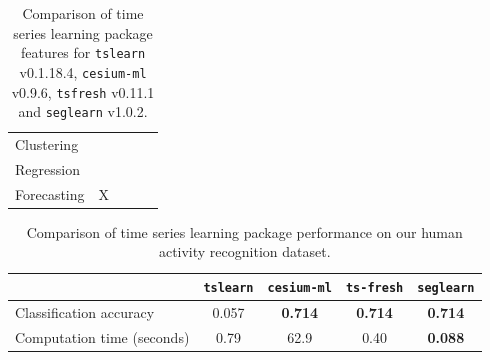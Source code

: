 \documentclass[twoside,11pt]{article}
\newcommand{\greencheck}{{\color{green}\checkmark}}
\newcommand{\redx}{{\color{red}X}}
\begin{document}
\begin{table}[]
\begin{tabular}{lcccc}
		Clustering                         & \greencheck              & \greencheck                & \greencheck               & \greencheck               \\
		Regression                         & \greencheck              & \greencheck                & \greencheck               & \greencheck               \\
		Forecasting                        & \redx               & \greencheck                & \greencheck               & \greencheck              \\ \bottomrule
	\end{tabular}
	\caption{Comparison of time series learning package features for \texttt{tslearn} v0.1.18.4, \texttt{cesium-ml} v0.9.6, \texttt{tsfresh} v0.11.1 and \texttt{seglearn} v1.0.2.}
	\label{t1:features}
\end{table}

\begin{table}[]
	\centering
	\begin{tabular}{@{}lcccc@{}}
		\toprule
		& \texttt{tslearn} & \texttt{cesium-ml} & \texttt{ts-fresh} & \texttt{seglearn}        \\ \midrule
		Classification accuracy & 0.057 & \textbf{0.714} & \textbf{0.714}  & \textbf{0.714} \\
		Computation time (seconds) & 0.79 & 62.9 & 0.40 & \textbf{0.088} \\ \bottomrule
	\end{tabular}
	\caption{Comparison of time series learning package performance on our human activity recognition dataset.}
	\label{t2:perf}
\end{table}









\newpage



\vskip 0.2in

\end{document}
